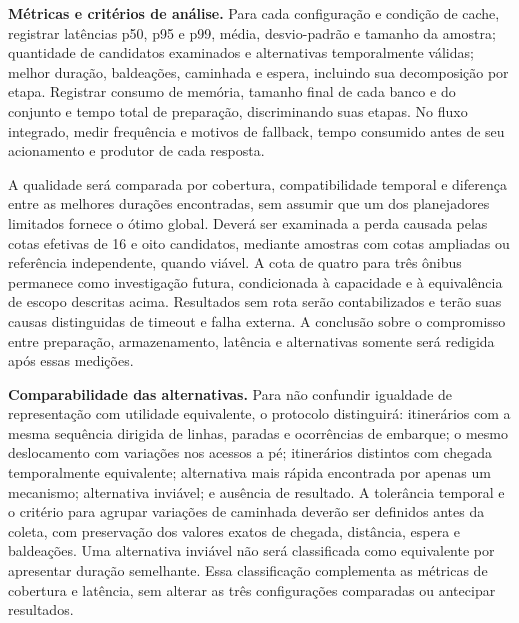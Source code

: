 \textbf{Métricas e critérios de análise.} Para cada configuração e condição de cache, registrar latências p50, p95 e p99, média, desvio-padrão e tamanho da amostra; quantidade de candidatos examinados e alternativas temporalmente válidas; melhor duração, baldeações, caminhada e espera, incluindo sua decomposição por etapa. Registrar consumo de memória, tamanho final de cada banco e do conjunto e tempo total de preparação, discriminando suas etapas. No fluxo integrado, medir frequência e motivos de fallback, tempo consumido antes de seu acionamento e produtor de cada resposta.

A qualidade será comparada por cobertura, compatibilidade temporal e diferença entre as melhores durações encontradas, sem assumir que um dos planejadores limitados fornece o ótimo global. Deverá ser examinada a perda causada pelas cotas efetivas de 16 e oito candidatos, mediante amostras com cotas ampliadas ou referência independente, quando viável. A cota de quatro para três ônibus permanece como investigação futura, condicionada à capacidade e à equivalência de escopo descritas acima. Resultados sem rota serão contabilizados e terão suas causas distinguidas de timeout e falha externa. A conclusão sobre o compromisso entre preparação, armazenamento, latência e alternativas somente será redigida após essas medições.


\textbf{Comparabilidade das alternativas.} Para não confundir igualdade de representação com utilidade equivalente, o protocolo distinguirá: itinerários com a mesma sequência dirigida de linhas, paradas e ocorrências de embarque; o mesmo deslocamento com variações nos acessos a pé; itinerários distintos com chegada temporalmente equivalente; alternativa mais rápida encontrada por apenas um mecanismo; alternativa inviável; e ausência de resultado. A tolerância temporal e o critério para agrupar variações de caminhada deverão ser definidos antes da coleta, com preservação dos valores exatos de chegada, distância, espera e baldeações. Uma alternativa inviável não será classificada como equivalente por apresentar duração semelhante. Essa classificação complementa as métricas de cobertura e latência, sem alterar as três configurações comparadas ou antecipar resultados.

\begingroup\setlength{\parskip}{0.3\baselineskip}\endgroup
